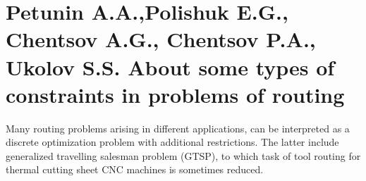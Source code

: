 \section*{Petunin A.A.,Polishuk E.G., Chentsov A.G., Chentsov P.A., Ukolov S.S.
About some types of constraints in problems of routing}

Many routing problems arising in different applications,
can be interpreted as a discrete optimization problem with additional restrictions.
The latter include generalized travelling salesman problem (GTSP),
to which task of tool routing for thermal cutting sheet CNC machines
is sometimes reduced.

